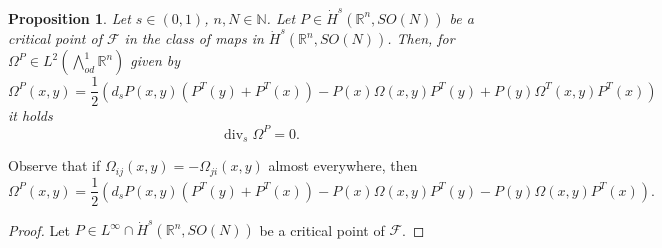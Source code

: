 \documentclass[12pt]{amsart}
\def\N{{\mathbb N}}
\newtheorem{proposition}[theorem]{Proposition}
\theoremstyle{definition}
\newcommand{\R}{\mathbb{R}}
\newcommand{\brac}[1]{\left (#1 \right )}
\newcommand{\Ep}{\bigwedge\nolimits}
\numberwithin{theorem}{section} \numberwithin{equation}{section}
\renewcommand{\div}{\operatorname{div}}
\begin{document}
\begin{proposition}
Let $s \in (0,1)$, $n,N \in \N$. Let $P \in \dot{H}^{s}(\R^n,SO(N))$ be a critical point of $\mathcal{F}$ in the class of maps in $\dot{H}^{s}(\R^n,SO(N))$. Then, for $\Omega^P \in L^2(\Ep^{1}_{od} \R^n)$ given by
\[
 \Omega^P(x,y) =\frac{1}{2} \brac{d_sP(x,y) \brac{P^T(y) + P^T(x)} - P(x) \Omega(x,y) P^T(y) + P(y) \Omega^T(x,y) P^T(x)} 
\]
it holds 
\[
\div_s \Omega^P = 0. 
\]
\end{proposition}
Observe that if $\Omega_{ij}(x,y) = -\Omega_{ji}(x,y)$ almost everywhere, then 
\[
 \Omega^P(x,y) = \frac{1}{2} \brac{d_sP(x,y) \brac{P^T(y) + P^T(x)} - P(x) \Omega(x,y) P^T(y) - P(y) \Omega(x,y) P^T(x)}.
\]
\begin{proof}
Let $P \in  L^\infty \cap \dot{H}^{s}(\R^n,SO(N))$ be a critical point of $\mathcal{F}$.


\end{proof}
\end{document}

